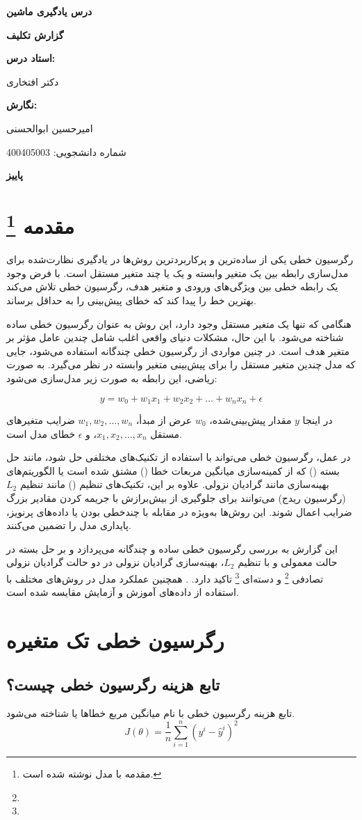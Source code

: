 \documentclass{article}
\def\maketitle{
	\begin{titlepage}
		\begin{center}
			\vspace*{2cm}
			
			{\Large\bfseries درس یادگیری ماشین\par}
			\vspace{2cm}
			
			{\Huge\bfseries گزارش تکلیف
				\lr{Linear Regression}\par}
			\vspace{3cm}
			
			{\large\bfseries استاد درس:\par}
			{\large دکتر افتخاری\par}
			\vspace{1.5cm}
			
			{\large\bfseries نگارش:\par}
			{\large امیرحسین ابوالحسنی\par}
			{\large شماره دانشجویی: 400405003\par}
			\vspace{2cm}
			
			\vfill  %
			
			{\large\bfseries پاییز \lr{1403}}
			
		\end{center}
	\end{titlepage}
	\setcounter{page}{1}
}
\begin{document}
	\maketitle	
	\tableofcontents
	\newpage
	\section{مقدمه
		\footnote{مقدمه با مدل  نوشته شده است.}
	}
	
	رگرسیون خطی یکی از ساده‌ترین و پرکاربردترین روش‌ها در یادگیری نظارت‌شده برای مدل‌سازی رابطه بین یک متغیر وابسته و یک یا چند متغیر مستقل است. با فرض وجود یک رابطه خطی بین ویژگی‌های ورودی و متغیر هدف، رگرسیون خطی تلاش می‌کند بهترین خط را پیدا کند که خطای پیش‌بینی را به حداقل برساند.
	
	هنگامی که تنها یک متغیر مستقل وجود دارد، این روش به عنوان رگرسیون خطی ساده شناخته می‌شود. با این حال، مشکلات دنیای واقعی اغلب شامل چندین عامل مؤثر بر متغیر هدف است. در چنین مواردی از رگرسیون خطی چندگانه استفاده می‌شود، جایی که مدل چندین متغیر مستقل را برای پیش‌بینی متغیر وابسته در نظر می‌گیرد. به صورت ریاضی، این رابطه به صورت زیر مدل‌سازی می‌شود:
	
	\[
	y = w_0 + w_1 x_1 + w_2 x_2 + \dots + w_n x_n + \epsilon
	\]
	
	در اینجا \( y \) مقدار پیش‌بینی‌شده، \( w_0 \) عرض از مبدأ، \( w_1, w_2, \dots, w_n \) ضرایب متغیرهای مستقل \( x_1, x_2, \dots, x_n \)، و \( \epsilon \) خطای مدل است.
	
	در عمل، رگرسیون خطی می‌تواند با استفاده از تکنیک‌های مختلفی حل شود، مانند حل بسته () که از کمینه‌سازی میانگین مربعات خطا () مشتق شده است یا الگوریتم‌های بهینه‌سازی مانند گرادیان نزولی. علاوه بر این، تکنیک‌های تنظیم () مانند تنظیم \( L_2 \) (رگرسیون ریدج) می‌توانند برای جلوگیری از بیش‌برازش با جریمه کردن مقادیر بزرگ ضرایب اعمال شوند. این روش‌ها به‌ویژه در مقابله با چندخطی بودن یا داده‌های پرنویز، پایداری مدل را تضمین می‌کنند.
	
	این گزارش به بررسی رگرسیون خطی ساده و چندگانه می‌پردازد و بر حل بسته در حالت معمولی و با تنظیم $L_2$، بهینه‌سازی گرادیان نزولی در دو حالت گرادیان نزولی تصادفی
	\footnote{}
	 و دسته‌ای
	 \footnote{}
	 تاکید دارد.
	  . همچنین عملکرد مدل در روش‌های مختلف با استفاده از داده‌های آموزش و آزمایش مقایسه شده است.
	\section{رگرسیون خطی تک متغیره}
	\subsection{تابع هزینه رگرسیون خطی چیست؟}
	تابع هزینه رگرسیون خطی با نام میانگین مربع خطاها یا 
	شناخته می‌شود.
	\[J(\theta) = \frac{1}{n}\sum_{i = 1}^n (y^i - \hat{y}^i)^2\]
		
\end{document}
